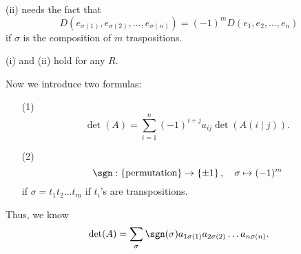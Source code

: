 \begin{remark}
    (ii) needs the fact that 
    \[
        D \left( e_{\sigma (1)}, e_{\sigma (2)}, \dots , e_{\sigma (n)} \right) = (-1)^m D(e_1, e_2, \dots , e_n) 
    \] if \(\sigma \) is the composition of \(m\) traspositions.  
\end{remark}

\begin{remark}
    (i) and (ii) hold for any \(R\). 
\end{remark}

Now we introduce two formulas: 
\begin{itemize}
    \item [(1)] 
    \[
        \det (A) = \sum_{i=1}^n (-1)^{i+j} a_{ij} \det \left( A(i \mid j) \right).  
    \]
    \item [(2)] 
    \[
        \sgn : \left\{ \text{permutation}  \right\} \to \left\{ \pm 1 \right\}, \quad \sigma \mapsto (-1)^m   
    \] if \(\sigma = t_1 t_2 \dots t_m\) if \(t_i\)'s are transpositions.  
\end{itemize}

Thus, we know 
\[
    \det (A) = \sum_{\sigma } \sgn (\sigma ) a_{1 \sigma (1)} a_{2 \sigma (2)} \dots a_{n \sigma (n)}. 
\]